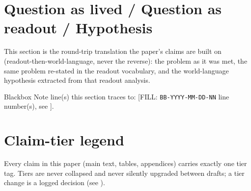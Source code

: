 \documentclass[10pt,twocolumn]{article}
\begin{document}
\section{Question as lived / Question as readout / Hypothesis}
\label{sec:question-lens}
This section is the round-trip translation the paper's claims are built on
(readout-then-world-language, never the reverse): the problem as it was met,
the same problem re-stated in the readout vocabulary, and the world-language
hypothesis extracted from that readout analysis.
\begin{description}[style=nextline,leftmargin=1.4em,font=\bfseries]
  \item[Question as lived] [FILL: the human-language question exactly as
    first asked, verbatim, with a language tag, e.g.\ \emph{(th)} or
    \emph{(en)}. Do not polish it into academic register here.]
  \item[Question as readout] [FILL: the same question translated into the
    declared readout vocabulary --- access source, what that source
    distinguishes, what it does not (same-fiber) distinguish, and any
    contaminated concept it hides.]
  \item[Hypothesis] [FILL: the world-language hypothesis extracted from the
    readout analysis, plus its falsifier --- what observation would make this
    paper wrong.]
\end{description}
Blackbox Note line(s) this section traces to: [FILL: \texttt{BB-YYYY-MM-DD-NN}
line number(s), see ].

\section{Claim-tier legend}
\label{sec:tiers}
Every claim in this paper (main text, tables, appendices) carries exactly one
tier tag. Tiers are never collapsed and never silently upgraded between
drafts; a tier change is a logged decision (see ).
\end{document}
